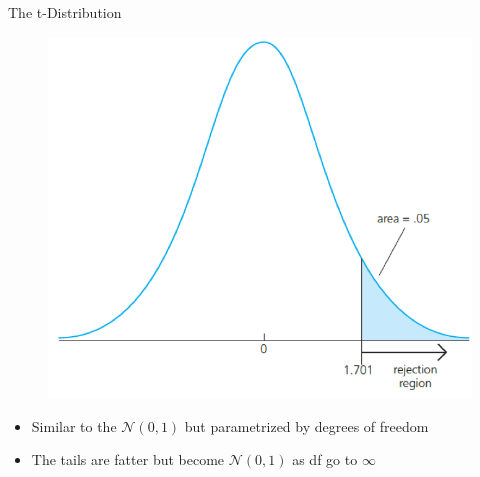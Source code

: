 %
%
%
%
%

\begin{frame}{The t-Distribution}

\begin{figure}[htp]
\centering
	\includegraphics[width=.4\textwidth]{tDistribution}	
\end{figure}

\begin{itemize}
	\item Similar to the $\mathcal{N}(0,1)$ but parametrized by degrees of freedom
	\item The tails are fatter but become $\mathcal{N}(0,1)$ as df go to $\infty$
\end{itemize}
	
\end{frame}

